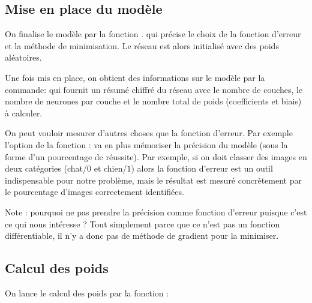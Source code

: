 \documentclass[11pt,class=report,crop=false]{standalone}
\begin{document}
  

\subsection{Mise en place du modèle}

On finalise le modèle par la fonction .
qui précise le choix de la fonction d'erreur et la méthode de minimisation.
Le réseau est alors initialisé avec des poids aléatoires.

Une fois mis en place, on obtient des informations sur le modèle par la commande:
qui fournit un résumé chiffré du réseau avec le nombre de couches, le nombre de neurones par couche et le nombre total de poids (coefficients et biais) à calculer. 

On peut vouloir mesurer d'autres choses que la fonction d'erreur.
Par exemple l'option  de la fonction  : 
va en plus mémoriser la précision du modèle (sous la forme d'un pourcentage de réussite).
Par exemple, si on doit classer des images en deux catégories (chat/$0$ et chien/$1$) alors la fonction d'erreur est un outil indispensable pour notre problème, mais le résultat est mesuré concrètement par le pourcentage d'images correctement identifiées.

Note : pourquoi ne pas prendre la précision comme fonction d'erreur puisque c'est ce qui nous intéresse ? Tout simplement parce que ce n'est pas un fonction différentiable, il n'y a donc pas de méthode de gradient pour la minimiser.


\subsection{Calcul des poids}

On lance le calcul des poids par la fonction  :

\end{document}
